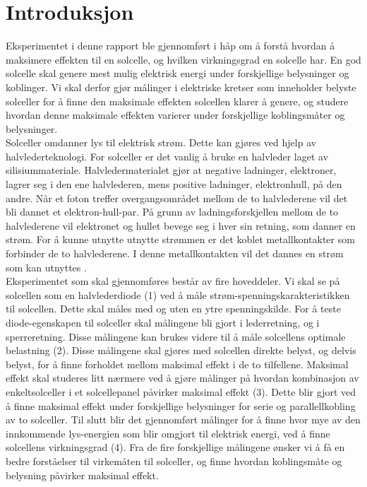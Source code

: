 \documentclass[%
 reprint,
 amsmath,amssymb,
 aps,
 norsk,
 booktabs
]{revtex4-1}
\begin{document}
\section{Introduksjon}
Eksperimentet i denne rapport ble gjennomført i håp om å forstå hvordan å maksimere effekten til en solcelle, og hvilken virkningsgrad en solcelle har. En god solcelle skal genere mest mulig elektrisk energi under forskjellige belysninger og koblinger. Vi skal derfor gjør målinger i elektriske kretser som inneholder belyste solceller for å finne den maksimale effekten solcellen klarer å genere, og studere hvordan denne maksimale effekten varierer under forskjellige koblingsmåter og belysninger.\\
Solceller omdanner lys til elektrisk strøm. Dette kan gjøres ved hjelp av halvlederteknologi. For solceller er det vanlig å bruke en halvleder laget av silisiummateriale. Halvledermaterialet gjør at negative ladninger, elektroner, lagrer seg i den ene halvlederen, mens positive ladninger, elektronhull, på den andre. Når et foton treffer overgangsområdet mellom de to halvlederene vil det bli dannet et elektron-hull-par. På grunn av ladningsforskjellen mellom de to halvlederene vil elektronet og hullet bevege seg i hver sin retning, som danner en strøm. For å kunne utnytte utnytte strømmen er det koblet metallkontakter som forbinder de to halvlederene. I denne metallkontakten vil det dannes en strøm som kan utnyttes \cite{snl}.\\
Eksperimentet som skal gjennomføres består av fire hoveddeler. Vi skal se på solcellen som en halvlederdiode (1) ved å måle strøm-spenningskarakteristikken til solcellen. Dette skal måles med og uten en ytre spenningskilde. For å teste diode-egenskapen til solceller skal målingene bli gjort i lederretning, og i sperreretning. Disse målingene kan brukes videre til å måle solcellens optimale belastning (2). Disse målingene skal gjøres med solcellen direkte belyst, og delvis belyst, for å finne forholdet mellom maksimal effekt i de to tilfellene. Maksimal effekt skal studeres litt nærmere ved å gjøre målinger på hvordan kombinasjon av enkeltsolceller i et solcellepanel påvirker maksimal effekt (3). Dette blir gjort ved å finne maksimal effekt under forskjellige belysninger for serie og parallellkobling av to solceller. Til slutt blir det gjennomført målinger for å finne hvor mye av den innkommende lys-energien som blir omgjort til elektrisk energi, ved å finne solcellens virkningsgrad (4). Fra de fire forskjellige målingene ønsker vi å få en bedre forståelser til virkemåten til solceller, og finne hvordan koblingsmåte og belysning påvirker maksimal effekt. \\
\end{document}
